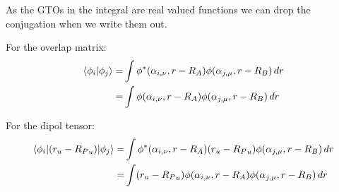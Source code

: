 As the GTOs in the integral are real valued functions we can drop the conjugation when we write them out.

For the overlap matrix:
\begin{align}
        \braket{\phi_i|\phi_j} = &\int \phi^*(\alpha_{i,\nu},r-R_A)\phi(\alpha_{j,\mu},r-R_B)\,dr\\
        =&\int \phi(\alpha_{i,\nu},r-R_A)\phi(\alpha_{j,\mu},r-R_B)\,dr\notag
\end{align}

For the dipol tensor:
\begin{align}
        \braket{\phi_i|(r_u-{R_P}_u)|\phi_j} = &\int \phi^*(\alpha_{i,\nu},r-R_A)(r_u-{R_P}_u)\phi(\alpha_{j,\mu},r-R_B)\,dr\\
        =&\int (r_u-{R_P}_u)\phi(\alpha_{i,\nu},r-R_A)\phi(\alpha_{j,\mu},r-R_B)\,dr\notag
\end{align}

